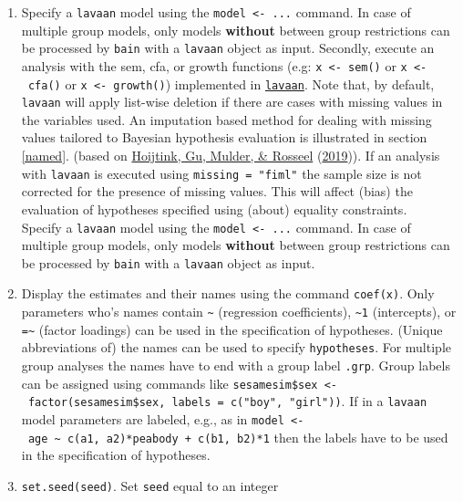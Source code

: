 \documentclass[
]{book}
\begin{document}
\begin{enumerate}
\def\labelenumi{\arabic{enumi})}
\item
  Specify a \texttt{lavaan} model using the \texttt{model\ \textless{}-\ ...} command. In case
  of multiple group models, only models \textbf{without} between group
  restrictions can be processed by \texttt{bain} with a \texttt{lavaan} object
  as input. Secondly, execute an analysis with the sem, cfa, or growth functions (e.g: \texttt{x\ \textless{}-\ sem()} or \texttt{x\ \textless{}-\ cfa()} or \texttt{x\ \textless{}-\ growth()}) implemented in \href{https://lavaan.ugent.be}{\texttt{lavaan}}.
  Note that, by default, \texttt{lavaan} will apply list-wise deletion if there are cases with missing values in the variables used. An imputation based method
  for dealing with missing values tailored to Bayesian hypothesis
  evaluation is illustrated in section \ref{named}. (based on \protect\hyperlink{ref-hoijtink2019computing}{Hoijtink, Gu, Mulder, \& Rosseel} (\protect\hyperlink{ref-hoijtink2019computing}{2019})). If an analysis with \texttt{lavaan} is executed using \texttt{missing\ =\ "fiml"} the sample size is not corrected for the presence of missing values. This will affect (bias) the evaluation of hypotheses specified using (about) equality constraints.\\
  Specify a \texttt{lavaan} model using the \texttt{model\ \textless{}-\ ...} command. In case
  of multiple group models, only models \textbf{without} between group
  restrictions can be processed by \texttt{bain} with a \texttt{lavaan} object
  as input.
\item
  Display the estimates and their names using the command \texttt{coef(x)}.
  Only parameters who's names contain \texttt{\textasciitilde{}} (regression coefficients),
  \texttt{\textasciitilde{}1} (intercepts), or \texttt{=\textasciitilde{}} (factor loadings) can be used in the
  specification of hypotheses. (Unique abbreviations of) the names
  can be used to specify \texttt{hypotheses}. For multiple group analyses
  the names have to end with a group label \texttt{.grp}. Group labels
  can be assigned using commands like
  \texttt{sesamesim\$sex\ \textless{}-\ factor(sesamesim\$sex,\ labels\ =\ c("boy",\ "girl"))}.
  If in a \texttt{lavaan} model parameters are labeled, e.g., as in
  \texttt{model\ \textless{}-\ \textquotesingle{}age\ \textasciitilde{}\ c(a1,\ a2)*peabody\ +\ c(b1,\ b2)*1} then the labels
  have to be used in the specification of hypotheses.
\item
  \texttt{set.seed(seed)}. Set \texttt{seed} equal to an integer

\end{enumerate}
\end{document}
